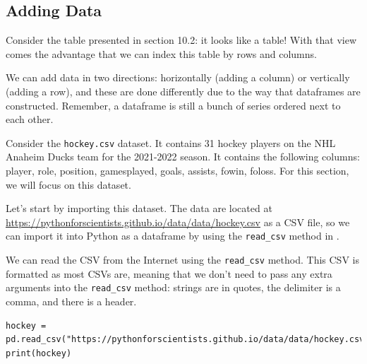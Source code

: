 \subsection{Adding Data}
Consider the table presented in section 10.2: it looks like a table! With that view comes the advantage that we can index this table by rows and columns.\par
{}
We can add data in two directions: horizontally (adding a column) or vertically (adding a row), and these are done differently due to the way that dataframes are constructed. Remember, a  dataframe is still a bunch of  series ordered next to each other.\par
Consider the \verb|hockey.csv| dataset. It contains 31 hockey players on the NHL Anaheim Ducks team for the 2021-2022 season. It contains the following columns: player, role, position, gamesplayed, goals, assists, fowin, foloss. For this section, we will focus on this dataset.\par
Let's start by importing this dataset. The data are located at\\ \href{https://pythonforscientists.github.io/data/data/hockey.csv}{https://pythonforscientists.github.io/data/data/hockey.csv} as a CSV file, so we can import it into Python as a  dataframe by using the \verb|read_csv| method in .\par
{}
We can read the CSV from the Internet using the \verb|read_csv| method. This CSV is formatted as most CSVs are, meaning that we don't need to pass any extra arguments into the \verb|read_csv| method: strings are in quotes, the delimiter is a comma, and there is a header.
\begin{lstlisting}[style=pippython]
hockey = pd.read_csv("https://pythonforscientists.github.io/data/data/hockey.csv")
print(hockey)
\end{lstlisting}
